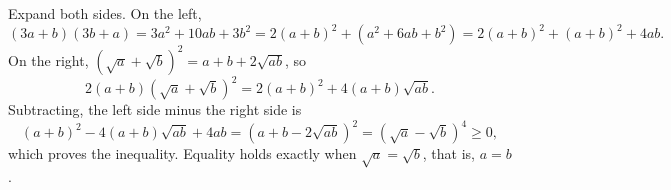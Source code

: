 Expand both sides. On the left,
\[
(3a+b)(3b+a)=3a^2+10ab+3b^2=2(a+b)^2+\left(a^2+6ab+b^2\right)=2(a+b)^2+(a+b)^2+4ab .
\]
On the right, $\left(\sqrt a+\sqrt b\right)^2=a+b+2\sqrt{ab}$, so
\[
2(a+b)\left(\sqrt a+\sqrt b\right)^2=2(a+b)^2+4(a+b)\sqrt{ab}.
\]
Subtracting, the left side minus the right side is
\[
(a+b)^2-4(a+b)\sqrt{ab}+4ab=\left(a+b-2\sqrt{ab}\right)^2=\left(\sqrt a-\sqrt b\right)^4\ge0 ,
\]
which proves the inequality. Equality holds exactly when $\sqrt a=\sqrt b$, that is, $\boxed{a=b}$.
